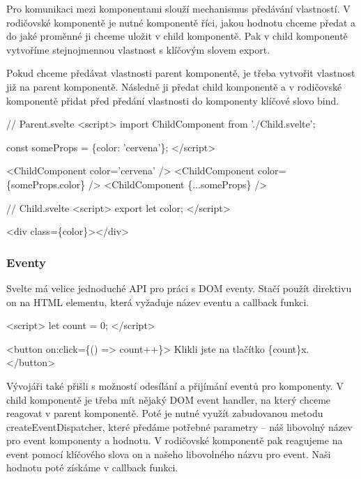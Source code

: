 Pro komunikaci mezi komponentami slouží mechanismus předávání vlastností. 
V rodičovské komponentě je nutné komponentě říci, jakou hodnotu chceme předat a do jaké proměnné ji chceme uložit v child komponentě. 
Pak v child komponentě vytvoříme stejnojmennou vlastnost s klíčovým slovem export.

Pokud chceme předávat vlastnosti parent komponentě, je třeba vytvořit vlastnost již na parent komponentě. 
Následně ji předat child komponentě a v rodičovské komponentě přidat před předání vlastnosti do komponenty klíčové slovo bind.\cite{svelte}

\begin{prog}
// Parent.svelte
<script>
  import ChildComponent from './Child.svelte';

  const someProps = \{color: 'cervena'\};
</script>

<ChildComponent color='cervena' />
<ChildComponent color=\{someProps.color\} />
<ChildComponent \{...someProps\} />

// Child.svelte
<script>
  export let color;
</script>

<div class=\{color\}></div>
\end{prog}

\subsubsection{Eventy} %

Svelte má velice jednoduché API pro práci s DOM eventy. Stačí použít direktivu on na HTML elementu, která vyžaduje název eventu a callback funkci.

\begin{prog}
<script>
  let count = 0;
</script>

<button on:click=\{() => count++\}>
  Klikli jste na tlačítko \{count\}x.
</button>
\end{prog}

Vývojáři také přišli s možností odesílání a přijímání eventů pro komponenty. 
V child komponentě je třeba mít nějaký DOM event handler, na který chceme reagovat v parent komponentě. 
Poté je nutné využít zabudovanou metodu createEventDispatcher, které předáme potřebné parametry -- náš libovolný název pro event komponenty a hodnotu. 
V rodičovské komponentě pak reagujeme na event pomocí klíčového slova on a našeho libovolného názvu pro event. Naši hodnotu poté získáme v callback funkci.\cite{sveltehandbook,svelte}

